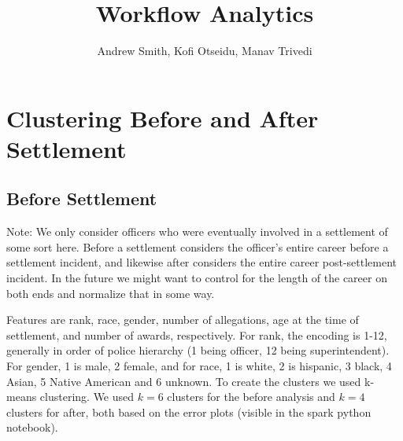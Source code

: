 \documentclass{article}
\title{Workflow Analytics}
\author{Andrew Smith, Kofi Otseidu, Manav Trivedi}
\begin{document}
\maketitle

\section{Clustering Before and After Settlement}
\subsection{Before Settlement}
Note: We only consider officers who were eventually involved in a settlement of some sort here. Before a settlement considers the officer's entire career before a settlement incident, and likewise after considers the entire career post-settlement incident. In the future we might want to control for the length of the career on both ends and normalize that in some way.

Features are rank, race, gender, number of allegations, age at the time of settlement, and number of awards, respectively. For rank, the encoding is 1-12, generally in order of police hierarchy (1 being officer, 12 being superintendent). For gender, 1 is male, 2 female, and for race, 1 is white, 2 is hispanic, 3 black, 4 Asian, 5 Native American and 6 unknown. To create the clusters we used k-means clustering. We used $k=6$ clusters for the before analysis and $k=4$ clusters for after, both based on the error plots (visible in the spark python notebook).
\end{document}
